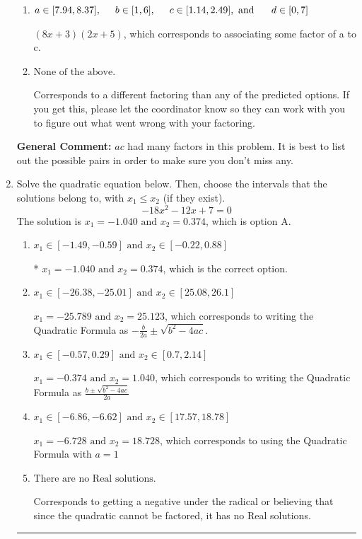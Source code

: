 \documentclass{extbook}[14pt]
\newcommand{\litem}[1]{\item #1

\rule{\textwidth}{0.4pt}}
\begin{document}
\begin{enumerate}
{\begin{enumerate}[label=\Alph*.]
 $(x + 12)(x + 20)$, which corresponds to factoring $x^{2} +32 x + 240$.
\item \( a \in [7.94, 8.37], \hspace*{5mm} b \in [1, 6], \hspace*{5mm} c \in [1.14, 2.49], \text{ and } \hspace*{5mm} d \in [0, 7] \)

 $(8x + 3)(2x + 5)$, which corresponds to associating some factor of a to c.
\item \( \text{None of the above.} \)

 Corresponds to a different factoring than any of the predicted options. If you get this, please let the coordinator know so they can work with you to figure out what went wrong with your factoring.
\end{enumerate}

\textbf{General Comment:} $ac$ had many factors in this problem. It is best to list out the possible pairs in order to make sure you don't miss any.
}
\litem{
Solve the quadratic equation below. Then, choose the intervals that the solutions belong to, with $x_1 \leq x_2$ (if they exist).
\[ -18x^{2} -12 x + 7 = 0 \]The solution is \( x_1 = -1.040 \text{ and } x_2 = 0.374 \), which is option A.\begin{enumerate}[label=\Alph*.]
\item \( x_1 \in [-1.49, -0.59] \text{ and } x_2 \in [-0.22, 0.88] \)

* $x_1 = -1.040 \text{ and } x_2 = 0.374$, which is the correct option.
\item \( x_1 \in [-26.38, -25.01] \text{ and } x_2 \in [25.08, 26.1] \)

 $x_1 = -25.789 \text{ and } x_2 = 25.123$, which corresponds to writing the Quadratic Formula as $-\frac{b}{2a} \pm \sqrt{b^2 - 4ac}$.
\item \( x_1 \in [-0.57, 0.29] \text{ and } x_2 \in [0.7, 2.14] \)

 $x_1 = -0.374 \text{ and } x_2 = 1.040$, which corresponds to writing the Quadratic Formula as $\frac{b \pm \sqrt{b^2 - 4ac}}{2a}$
\item \( x_1 \in [-6.86, -6.62] \text{ and } x_2 \in [17.57, 18.78] \)

 $x_1 = -6.728 \text{ and } x_2 = 18.728$, which corresponds to using the Quadratic Formula with $a=1$
\item \( \text{There are no Real solutions.} \)

Corresponds to getting a negative under the radical or believing that since the quadratic cannot be factored, it has no Real solutions.
\end{enumerate}

}
\end{enumerate}
\end{document}
